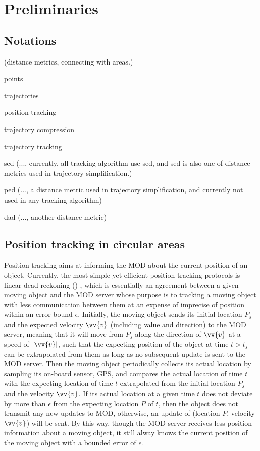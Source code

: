 



\section{Preliminaries}
\label{sec-pre}

\subsection{Notations}
(distance metrics, connecting with areas.)

points

trajectories

position tracking

trajectory compression

trajectory tracking


sed (..., currently, all tracking algorithm use sed, and sed is also one of distance metrics used in trajectory simplification.)

ped (..., a distance metric used in trajectory simplification, and currently not used in any tracking algorithm)

dad (..., another distance metric)


\subsection{Position tracking in circular areas}

Position tracking aims at informing the MOD about the current position of an object. Currently, the most simple yet efficient position tracking protocols is linear dead reckoning (\ldr) \cite{Lange:Tracking, Leonhardi:Comparison, Civilis:Techniques, Wolfson:Databases}, which is essentially an agreement between a given moving object and the MOD server whose purpose is to tracking a moving object with less communication between them at an expense of imprecise of position within an error bound $\epsilon$.  
%
Initially, the moving object sends its initial location $P_s$ and the expected velocity $\vv{v}$
(including value and direction) to the MOD server, meaning that it will move from $P_s$ along the direction of $\vv{v}$ at a speed of $|\vv{v}|$, such that the expecting position of the object at time $t>t_s$ can be extrapolated from them as long as no subsequent update is sent to the MOD server.
%
Then the moving object periodically collects its actual location by sampling its on-board sensor, \eg GPS, and compares the actual location of time $t$ with the expecting location of time $t$ extrapolated from the initial location $P_s$ and the velocity $\vv{v}$. If its actual location at a given time $t$ does not deviate by more than $\epsilon$ from the expecting location $P$ of $t$, then the object does not transmit any new updates to MOD, otherwise, an update of (location $P$, velocity $\vv{v}$) will be sent.
%
By this way, though the MOD server receives less position information about a moving object, it still alway knows the current position of the moving object with a bounded error of $\epsilon$.



